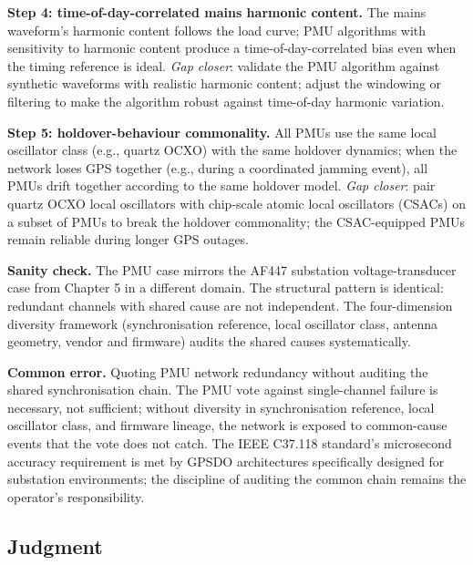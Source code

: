 \begin{exercise}
\textbf{Step 4: time-of-day-correlated mains harmonic content.}
The mains waveform's harmonic content follows the load curve;
PMU algorithms with sensitivity to harmonic content produce a
time-of-day-correlated bias even when the timing reference is
ideal.
\emph{Gap closer}: validate the PMU algorithm against synthetic
waveforms with realistic harmonic content; adjust the windowing
or filtering to make the algorithm robust against time-of-day
harmonic variation.

\textbf{Step 5: holdover-behaviour commonality.} All PMUs use the
same local oscillator class (e.g., quartz OCXO) with the same
holdover dynamics; when the network loses GPS together (e.g.,
during a coordinated jamming event), all PMUs drift together
according to the same holdover model.
\emph{Gap closer}: pair quartz OCXO local oscillators with
chip-scale atomic local oscillators (CSACs) on a subset of PMUs
to break the holdover commonality; the CSAC-equipped PMUs
remain reliable during longer GPS outages.

\textbf{Sanity check.} The PMU case mirrors the AF447 substation
voltage-transducer case from Chapter 5 in a different domain.
The structural pattern is identical: redundant channels with
shared cause are not independent. The four-dimension diversity
framework (synchronisation reference, local oscillator class,
antenna geometry, vendor and firmware) audits the shared causes
systematically.

\textbf{Common error.} Quoting PMU network redundancy without
auditing the shared synchronisation chain. The PMU vote against
single-channel failure is necessary, not sufficient; without
diversity in synchronisation reference, local oscillator class,
and firmware lineage, the network is exposed to common-cause
events that the vote does not catch. The IEEE C37.118 standard's
microsecond accuracy requirement is met by GPSDO architectures
specifically designed for substation environments; the
discipline of auditing the common chain remains the operator's
responsibility.
\end{exercise}

\subsection*{Judgment}

